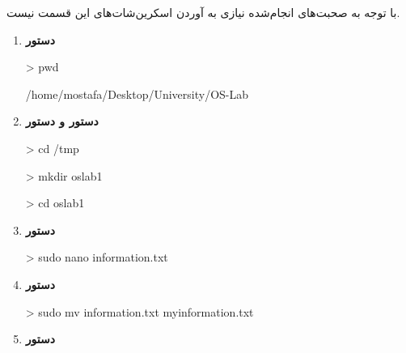 
با توجه به صحبت‌های انجام‌شده نیازی به آوردن اسکرین‌شات‌های این قسمت نیست.

\newpage
{}
\begin{enumerate}
	\item 
		\textbf{دستور }
		
		\begin{code}
			> pwd
			
			/home/mostafa/Desktop/University/OS-Lab
		\end{code}
	\item 
		\textbf{دستور  و دستور }
		\begin{code}
			> cd /tmp
			
			> mkdir oslab1
			
			> cd oslab1
		\end{code}
	\item 
		\textbf{دستور }
		\begin{code}
			> sudo nano information.txt
		\end{code}
	
	\item 
		\textbf{دستور }
		\begin{code}
			> sudo mv information.txt myinformation.txt
		\end{code}
	\item 
		\textbf{دستور }
		

\end{enumerate}
